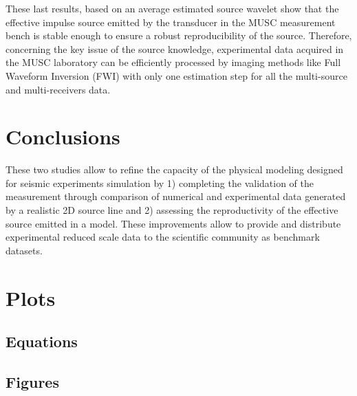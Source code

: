 \documentclass[manuscript,revised]{geophysics}
\begin{document}
\noindent These last results, based on an average estimated source wavelet show that the effective impulse source emitted by the transducer in the MUSC measurement bench is stable enough to ensure a robust reproducibility of the source. Therefore, concerning the key issue of the source knowledge, experimental data acquired in the MUSC laboratory can be efficiently processed by imaging methods like Full Waveform Inversion (FWI) with only one estimation step for all the multi-source and multi-receivers data.


\section{Conclusions}

\noindent These two studies allow to refine the capacity of the physical modeling designed for seismic experiments simulation by 1) completing the validation of the measurement through comparison of numerical and experimental data generated by a realistic 2D source line and 2) assessing the reproductivity of the effective source emitted in a model. These improvements allow to provide and distribute experimental reduced scale data to the scientific community as benchmark datasets.

\section{Plots}

\subsection*{Equations}

\subsection*{Figures}
\end{document}
